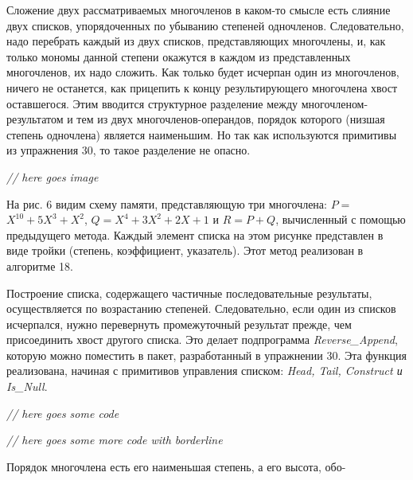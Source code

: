 \documentclass{../../template/mai_book}
\begin{document}
Сложение двух рассматриваемых многочленов в каком-то смысле есть слияние двух списков, упорядоченных по убыванию степеней одночленов. Следовательно, надо перебрать каждый из двух списков, представляющих многочлены, и, как только мономы данной степени окажутся в каждом из представленных многочленов, их надо сложить. Как только будет исчерпан один из многочленов, ничего не останется, как прицепить к концу результирующего многочлена хвост  оставшегося. Этим вводится структурное разделение между многочленом-результатом и тем из двух многочленов-операндов, порядок которого (низшая степень одночлена) является наименьшим. Но так как используются примитивы из упражнения 30, то такое разделение не опасно. \newline

\textit{// here goes image}

\newpage


На рис. 6 видим схему памяти, представляющую три многочлена: $P =$ \linebreak $X^{10} + 5X^3 + X^2$, $Q = X^4 + 3X^2 + 2X + 1$ и $R = P + Q$, вычисленный с помощью предыдущего метода. Каждый элемент списка на этом рисунке представлен в виде тройки (степень, коэффициент, указатель). Этот метод реализован в алгоритме 18.

Построение списка, содержащего частичные последовательные результаты, осуществляется по возрастанию степеней. Следовательно, если один из списков исчерпался, нужно перевернуть промежуточный результат \linebreak прежде, чем присоединить хвост другого списка. Это делает подпрограмма \textit{Reverse\_Append}, которую можно поместить в пакет, разработанный в \linebreak упражнении 30. Эта функция реализована, начиная с примитивов управления списком: \textit{Head, Tail, Construct и Is\_Null}. \newline

\textit{// here goes some code} \newline

\textit{// here goes some more code with borderline} \newline 

Порядок многочлена есть его наименьшая степень, а его высота, обо- \linebreak

\newpage

\end{document}
